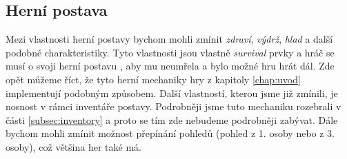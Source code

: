\subsection{Herní postava}
Mezi vlastnosti herní postavy bychom mohli zmínit \textit{zdraví}, \textit{výdrž}, \textit{hlad} a další podobné charakteristiky. Tyto vlastnosti jsou vlastně \textit{survival} prvky a hráč se musí o svoji herní postavu , aby mu neumřela a bylo možné hru hrát dál. Zde opět můžeme říct, že tyto herní mechaniky hry z kapitoly \ref{chap:uvod} implementují podobným způsobem.
Další vlastností, kterou jsme již zmínili, je nosnost v rámci inventáře postavy. Podrobněji jsme tuto mechaniku rozebrali v části \ref{subsec:inventory} a proto se tím zde nebudeme podrobněji zabývat. 
Dále bychom mohli zmínit možnost přepínání pohledů (pohled z 1. osoby nebo z 3. osoby), což většina her také má. 

